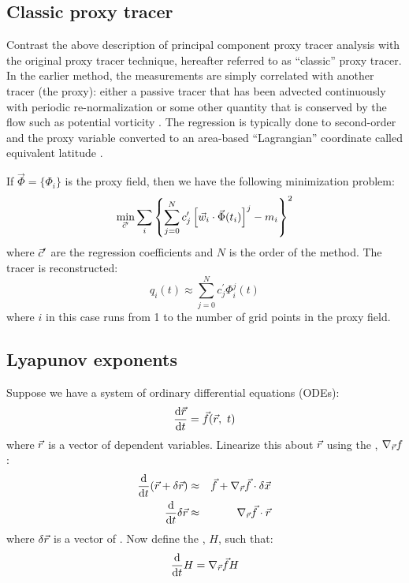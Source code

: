 \subsection{Classic proxy tracer}

\label{classic}

Contrast the above description of principal component proxy tracer
analysis with the original proxy tracer technique, hereafter
referred to as ``classic'' proxy tracer.
In the earlier method, the measurements are simply correlated with another
tracer (the proxy): either a passive tracer that has been advected
continuously with periodic re-normalization \citep{Allen_Nakamura2003} 
or some other quantity that is conserved by the flow 
such as potential vorticity \citep{Randall_etal2002,Hoskins_etal1985}.
The regression is typically done to second-order and the proxy variable
converted to an area-based ``Lagrangian'' coordinate called
equivalent latitude \citep{Butchart_Remsberg1986}.

If $\vec \Phi=\lbrace \Phi_i \rbrace$ is the proxy field, 
then we have the following minimization problem:
\begin{equation}
  \min_{\vec c^\prime} \sum_i \left \lbrace \sum_{j=0}^N c^\prime_j \left [\vec w_i \cdot \vec \Phi(t_i) \right ]^j - m_i \right \rbrace^2
\end{equation}
where $\vec c^\prime$ are the regression coefficients 
and $N$ is the order of the method. 
The tracer is reconstructed:
\begin{equation}
	q_i(t) \approx \sum_{j=0}^N c^\prime_j \Phi_i^j(t)
\end{equation}
where $i$ in this case runs from 1 to the number of grid points in the
proxy field.

\subsection{Lyapunov exponents}

Suppose we have a system of ordinary differential equations (ODEs):
\begin{equation}
	\frac{\mathrm d \vec r}{\mathrm d t} = \vec f(\vec r, ~ t)
	\label{ODE}
\end{equation}
where $\vec r$ is a vector of dependent variables.
Linearize this about $\vec r$ using the ,
$\nabla_{\vec r} f$:
\begin{eqnarray}
\frac{\mathrm d}{\mathrm d t} (\vec r + \delta \vec r) & \approx & \vec f + 
	\nabla_{\vec r} \vec f \cdot \delta \vec x \\
	\frac{\mathrm d}{\mathrm d t} \delta \vec r & \approx & \nabla_{\vec r} \vec f \cdot \vec r
\end{eqnarray}
where $\delta \vec r$ is a vector of .
Now define the , $H$, such that:
\begin{equation} 
	\frac{\mathrm d}{\mathrm d t} H = \nabla_{\vec r} \vec f H \\
\end{equation}

